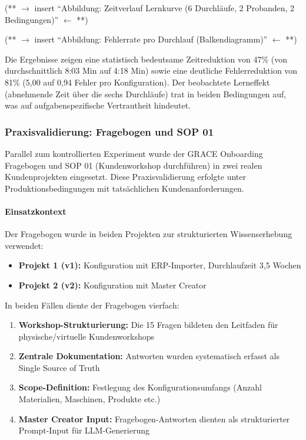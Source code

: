 (** $\rightarrow$ insert ``Abbildung: Zeitverlauf Lernkurve (6 Durchläufe, 2 Probanden, 2 Bedingungen)'' $\leftarrow$ **)

\label{fig:ZeitverlaufLernkurve}

(** $\rightarrow$ insert ``Abbildung: Fehlerrate pro Durchlauf (Balkendiagramm)'' $\leftarrow$ **)

\label{fig:FehlerrateProDurchlauf}

Die Ergebnisse zeigen eine statistisch bedeutsame Zeitreduktion von 47\% (von durchschnittlich 8:03 Min auf 4:18 Min) sowie eine deutliche Fehlerreduktion von 81\% (5,00 auf 0,94 Fehler pro Konfiguration). Der beobachtete Lerneffekt (abnehmende Zeit über die sechs Durchläufe) trat in beiden Bedingungen auf, was auf aufgabenspezifische Vertrautheit hindeutet.


\subsubsection{Praxisvalidierung: Fragebogen und SOP 01}
\label{subsubsec:PraxisvalidierungFragebogen}

Parallel zum kontrollierten Experiment wurde der GRACE Onboarding Fragebogen und SOP 01 (Kundenworkshop durchführen) in zwei realen Kundenprojekten eingesetzt. Diese Praxisvalidierung erfolgte unter Produktionsbedingungen mit tatsächlichen Kundenanforderungen.

\paragraph{Einsatzkontext}
Der Fragebogen wurde in beiden Projekten zur strukturierten Wissenserhebung verwendet:
\begin{itemize}
    \item \textbf{Projekt 1 (v1):} Konfiguration mit ERP-Importer, Durchlaufzeit 3,5 Wochen
    \item \textbf{Projekt 2 (v2):} Konfiguration mit Master Creator
\end{itemize}

In beiden Fällen diente der Fragebogen vierfach:
\begin{enumerate}
    \item \textbf{Workshop-Strukturierung:} Die 15 Fragen bildeten den Leitfaden für physische/virtuelle Kundenworkshops
    \item \textbf{Zentrale Dokumentation:} Antworten wurden systematisch erfasst als Single Source of Truth
    \item \textbf{Scope-Definition:} Festlegung des Konfigurationsumfangs (Anzahl Materialien, Maschinen, Produkte etc.)
    \item \textbf{Master Creator Input:} Fragebogen-Antworten dienten als strukturierter Prompt-Input für LLM-Generierung
\end{enumerate}

